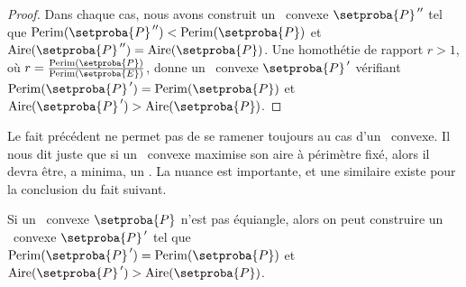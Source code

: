 \begin{proof}
	Dans chaque cas, nous avons construit un \ngone\ convexe $\dbleprimeit{\setproba{P}}$ tel que
	$\perim{\dbleprimeit{\setproba{P}}} < \perim{\setproba{P}}$
	et
	$\area{\dbleprimeit{\setproba{P}}} = \area{\setproba{P}}$.
	Une homothétie de rapport $r > 1$, où $r = \frac{ \perim{\setproba{P}} }{ \perim{\setproba{E}} }$, donne un \ngone\ convexe $\primeit{\setproba{P}}$ vérifiant
	$\perim{\primeit{\setproba{P}}} = \perim{\setproba{P}}$
	et
	$\area{\primeit{\setproba{P}}} > \area{\setproba{P}}$.
\end{proof}


\begin{remark}
	Le fait précédent ne permet pas de se ramener toujours au cas d'un \nequi\ convexe. Il nous dit juste que si un \ngone\ convexe maximise son aire à périmètre fixé, alors il devra être, a minima, un \nequi. La nuance est importante, et une similaire existe pour la conclusion du fait suivant.
\end{remark}




\begin{fact} \label{must-be-iso}
	Si un \nequi\ convexe $\setproba{P}$ n'est pas équiangle,
	alors on peut construire un \ngone\ convexe $\primeit{\setproba{P}}$ tel que
	$\perim{\primeit{\setproba{P}}} = \perim{\setproba{P}}$
	et
	$\area{\primeit{\setproba{P}}} > \area{\setproba{P}}$.
\end{fact}


